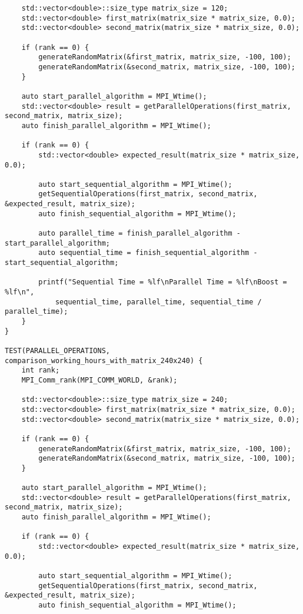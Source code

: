 \documentclass{report}
\begin{document}
\begin{lstlisting}
    std::vector<double>::size_type matrix_size = 120;
    std::vector<double> first_matrix(matrix_size * matrix_size, 0.0);
    std::vector<double> second_matrix(matrix_size * matrix_size, 0.0);

    if (rank == 0) {
        generateRandomMatrix(&first_matrix, matrix_size, -100, 100);
        generateRandomMatrix(&second_matrix, matrix_size, -100, 100);
    }

    auto start_parallel_algorithm = MPI_Wtime();
    std::vector<double> result = getParallelOperations(first_matrix, second_matrix, matrix_size);
    auto finish_parallel_algorithm = MPI_Wtime();

    if (rank == 0) {
        std::vector<double> expected_result(matrix_size * matrix_size, 0.0);

        auto start_sequential_algorithm = MPI_Wtime();
        getSequentialOperations(first_matrix, second_matrix, &expected_result, matrix_size);
        auto finish_sequential_algorithm = MPI_Wtime();

        auto parallel_time = finish_parallel_algorithm - start_parallel_algorithm;
        auto sequential_time = finish_sequential_algorithm - start_sequential_algorithm;

        printf("Sequential Time = %lf\nParallel Time = %lf\nBoost = %lf\n",
            sequential_time, parallel_time, sequential_time / parallel_time);
    }
}

TEST(PARALLEL_OPERATIONS, comparison_working_hours_with_matrix_240x240) {
    int rank;
    MPI_Comm_rank(MPI_COMM_WORLD, &rank);

    std::vector<double>::size_type matrix_size = 240;
    std::vector<double> first_matrix(matrix_size * matrix_size, 0.0);
    std::vector<double> second_matrix(matrix_size * matrix_size, 0.0);

    if (rank == 0) {
        generateRandomMatrix(&first_matrix, matrix_size, -100, 100);
        generateRandomMatrix(&second_matrix, matrix_size, -100, 100);
    }

    auto start_parallel_algorithm = MPI_Wtime();
    std::vector<double> result = getParallelOperations(first_matrix, second_matrix, matrix_size);
    auto finish_parallel_algorithm = MPI_Wtime();

    if (rank == 0) {
        std::vector<double> expected_result(matrix_size * matrix_size, 0.0);

        auto start_sequential_algorithm = MPI_Wtime();
        getSequentialOperations(first_matrix, second_matrix, &expected_result, matrix_size);
        auto finish_sequential_algorithm = MPI_Wtime();


\end{lstlisting}
\end{document}
